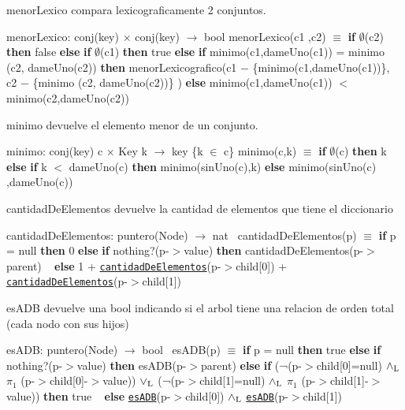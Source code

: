 \begin{DoxyParagraph}{menor\+Lexico}
compara lexicograficamente 2 conjuntos.

menor\+Lexico\+: conj(key) $\times$ conj(key) $\to$ bool menor\+Lexico(c1 ,c2) $\equiv$ {\bfseries if} $\emptyset$(c2) {\bfseries then} false {\bfseries else} {\bfseries if} $\emptyset$(c1) {\bfseries then} true {\bfseries else} {\bfseries if} minimo(c1,dame\+Uno(c1)) = minimo (c2, dame\+Uno(c2)) {\bfseries then} menor\+Lexicografico(c1 $-$ \{minimo(c1,dame\+Uno(c1))\}, c2 $-$ \{minimo (c2, dame\+Uno(c2))\} ) {\bfseries else} minimo(c1,dame\+Uno(c1)) $<$ minimo(c2,dame\+Uno(c2)) 
\end{DoxyParagraph}


\begin{DoxyParagraph}{minimo}
devuelve el elemento menor de un conjunto.

minimo\+: conj(key) c $\times$ Key k $\to$ key \{k $\in$ c\} minimo(c,k) $\equiv$ {\bfseries if} $\emptyset$(c) {\bfseries then} k {\bfseries else} {\bfseries if} k $<$ dame\+Uno(c) {\bfseries then} minimo(sin\+Uno(c),k) {\bfseries else} minimo(sin\+Uno(c) ,dame\+Uno(c)) 
\end{DoxyParagraph}


\begin{DoxyParagraph}{cantidad\+De\+Elementos}
devuelve la cantidad de elementos que tiene el diccionario

cantidad\+De\+Elementos\+: puntero(\+Node) $\to$ nat~\newline
 cantidad\+De\+Elementos(p) $\equiv$ {\bfseries if} p = null {\bfseries then} 0 {\bfseries else} {\bfseries if} nothing?(p-\/$>$value) {\bfseries then} cantidad\+De\+Elementos(p-\/$>$parent) ~\newline
 {\bfseries else} 1 + \href{axiomas.html#cantidadDeElementos}{\tt cantidad\+De\+Elementos}(p-\/$>$child\mbox{[}0\mbox{]}) + \href{axiomas.html#cantidadDeElementos}{\tt cantidad\+De\+Elementos}(p-\/$>$child\mbox{[}1\mbox{]}) 
\end{DoxyParagraph}


\begin{DoxyParagraph}{es\+A\+DB}
devuelve una bool indicando si el arbol tiene una relacion de orden total (cada nodo con sus hijos)

es\+A\+DB\+: puntero(\+Node) $\to$ bool~\newline
 es\+A\+D\+B(p) $\equiv$ {\bfseries if} p = null {\bfseries then} true {\bfseries else} {\bfseries if} nothing?(p-\/$>$value) {\bfseries then} es\+A\+DB(p-\/$>$parent) {\bfseries else} {\bfseries if} (¬(p-\/$>$child\mbox{[}0\mbox{]}=null) $\land_{\rm L}$ $\pi_1$ (p-\/$>$child\mbox{[}0\mbox{]}-\/$>$value)) $\lor_{\rm L}$ (¬(p-\/$>$child\mbox{[}1\mbox{]}=null) $\land_{\rm L}$ $\pi_1$ (p-\/$>$child\mbox{[}1\mbox{]}-\/$>$value)) {\bfseries then} true ~\newline
 {\bfseries else} \href{axiomas.html#esADB}{\tt es\+A\+DB}(p-\/$>$child\mbox{[}0\mbox{]}) $\land_{\rm L}$ \href{axiomas.html#esADB}{\tt es\+A\+DB}(p-\/$>$child\mbox{[}1\mbox{]}) 
\end{DoxyParagraph}


